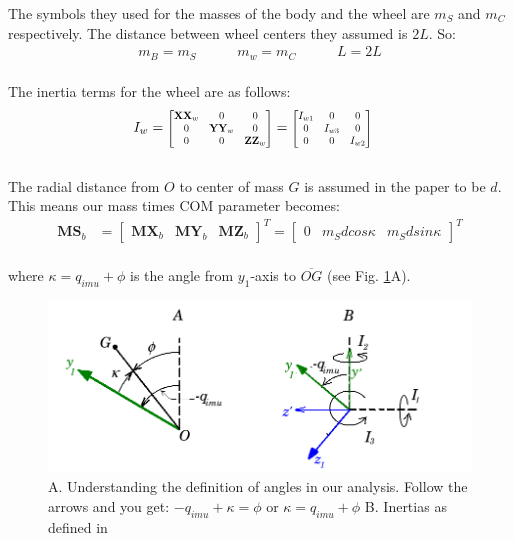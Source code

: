 \documentclass[a4paper,10pt]{article}
\newcommand\scalemath[2]{\scalebox{#1}{\mbox{\ensuremath{\displaystyle #2}}}}
\begin{document}
The symbols they used for the masses of the body and the wheel are $m_S$ and $m_C$ respectively. The distance between wheel centers
they assumed is $2L$. So:
\begin{align}
 m_B = m_S \hspace{35pt} m_w = m_C \hspace{35pt} L=2L \label{subsStart}
\end{align}
\\
The inertia terms for the wheel are as follows:
\begin{align}
 I_w &= \scalemath{0.75}{\left[\begin{matrix} \mathbf{XX}_w & 0 & 0 \\  
 0 & \mathbf{YY}_w & 0 \\ 
 0 & 0 & \mathbf{ZZ}_w \end{matrix}\right]}
 = \scalemath{0.75}{\left[\begin{matrix} I_{w1} & 0 & 0 \\  
 0 & I_{w3} & 0 \\ 
 0 & 0 & I_{w2} \end{matrix}\right]}
\end{align}
\\
The radial distance from 
$O$ to center of mass $G$ is assumed in the paper to be $d$. This means our mass times COM parameter becomes:
\begin{align}
 \mathbf{MS}_b &= \left[\begin{matrix} \mathbf{MX}_b & \mathbf{MY}_b & \mathbf{MZ}_b \end{matrix}\right]^T = \left[\begin{matrix} 0 & m_Sdcos\kappa & m_Sdsin\kappa \end{matrix}\right]^T  
\end{align} \\ where $\kappa = q_{imu} + \phi$ is the angle from $y_1$-axis to $\overline{OG}$ (see Fig. \ref{fig:kimAnglesInertias}A).
\begin{figure}[ht]
 \centering
 \includegraphics[width=\textwidth]{Figures/angles.png}
 \caption{A. Understanding the definition of angles in our analysis. Follow the arrows and you get: $-q_{imu}+\kappa=\phi$ or $\kappa=q_{imu}+\phi$
 \hspace{20pt}B. Inertias as defined in \cite{kim2005dynamic}}
 \label{fig:kimAnglesInertias}
\end{figure}
\end{document}
